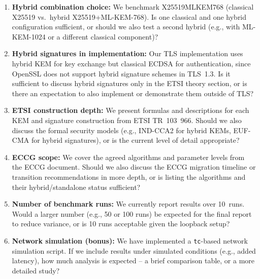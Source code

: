 \documentclass[11pt,a4paper]{article}
\begin{document}
\begin{enumerate}
    \item \textbf{Hybrid combination choice:} We benchmark X25519MLKEM768 (classical X25519 vs.\ hybrid X25519+ML-KEM-768). Is one classical and one hybrid configuration sufficient, or should we also test a second hybrid (e.g., with ML-KEM-1024 or a different classical component)?

    \item \textbf{Hybrid signatures in implementation:} Our TLS implementation uses hybrid KEM for key exchange but classical ECDSA for authentication, since OpenSSL does not support hybrid signature schemes in TLS~1.3. Is it sufficient to discuss hybrid signatures only in the ETSI theory section, or is there an expectation to also implement or demonstrate them outside of TLS?

    \item \textbf{ETSI construction depth:} We present formulas and descriptions for each KEM and signature construction from ETSI TR~103~966. Should we also discuss the formal security models (e.g., IND-CCA2 for hybrid KEMs, EUF-CMA for hybrid signatures), or is the current level of detail appropriate?

    \item \textbf{ECCG scope:} We cover the agreed algorithms and parameter levels from the ECCG document. Should we also discuss the ECCG migration timeline or transition recommendations in more depth, or is listing the algorithms and their hybrid/standalone status sufficient?

    \item \textbf{Number of benchmark runs:} We currently report results over 10~runs. Would a larger number (e.g., 50 or 100 runs) be expected for the final report to reduce variance, or is 10 runs acceptable given the loopback setup?

    \item \textbf{Network simulation (bonus):} We have implemented a \texttt{tc}-based network simulation script. If we include results under simulated conditions (e.g., added latency), how much analysis is expected -- a brief comparison table, or a more detailed study?
\end{enumerate}
\end{document}
